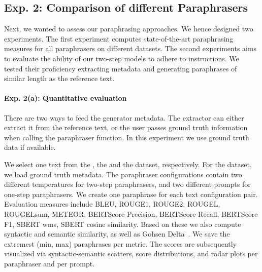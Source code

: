 \subsection{Exp. 2: Comparison of different Paraphrasers}
\label{subsec:comp_paraphrasers_setup}

Next, we wanted to assess our paraphrasing approaches.
We hence designed two experiments.
The first experiment computes state-of-the-art paraphrasing measures for all paraphrasers on different datasets.
The second experiments aims to evaluate the ability of our two-step models to adhere to instructions.
We tested their proficiency extracting metadata and generating paraphrases of similar length as the reference text.

\paragraph{Exp. 2(a): Quantitative evaluation}
There are two ways to feed the generator metadata.
The extractor can either extract it from the reference text, or the user passes ground truth information when calling the paraphraser function.
In this experiment we use ground truth data if available.

We select one text from the \dataBlog{}, the \dataGutenberg{} and the \dataStudent{} dataset, respectively.
For the \dataGutenberg{} dataset, we load ground truth metadata.
The paraphraser configurations contain two different temperatures for two-step paraphrasers, and two different prompts for one-step paraphrasers.
We create one paraphrase for each text configuration pair.
Evaluation measures include BLEU, ROUGE1, ROUGE2, ROUGEL, ROUGELsum, METEOR, BERTScore Precision, BERTScore Recall, BERTScore F1, SBERT \ac{wms}, SBERT cosine similarity.
Based on these we also compute syntactic and semantic similarity, as well as Gohsen Delta~\citep{gohsen_captions_2023}.
We save the extremest (min, max) paraphrases per metric.
The scores are subsequently visualized via syntactic-semantic scatters, score distributions, and radar plots per paraphraser and per prompt. 

